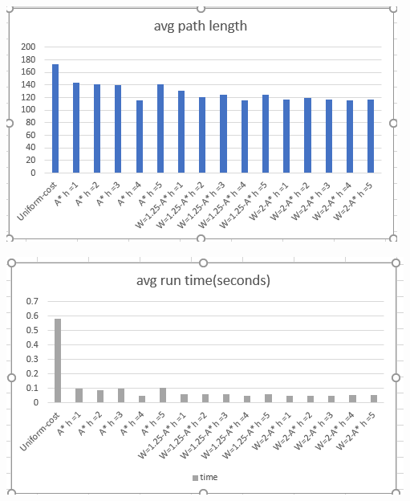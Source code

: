\documentclass[12pt, letterpaper]{article}
\begin{document}
\noindent \includegraphics[scale=0.8]{"avg-pathlength"}

\medskip

\noindent \includegraphics[scale=0.8]{"avg-runtime"}

\medskip
\end{document}
